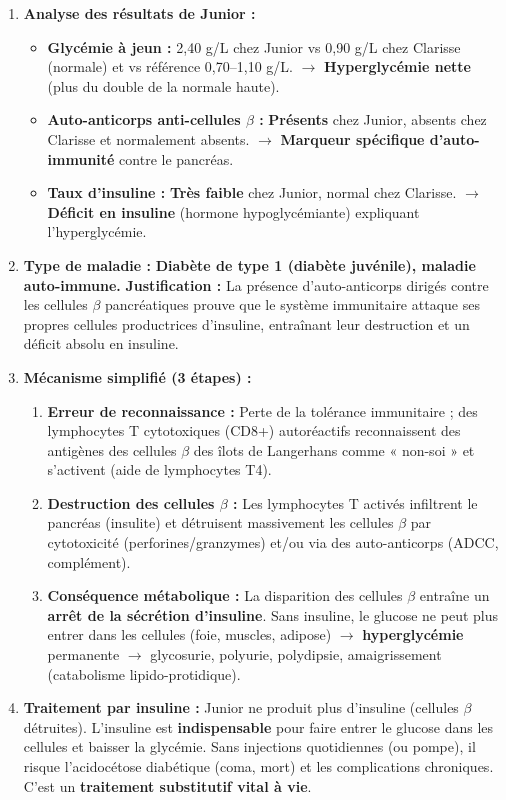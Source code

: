 \documentclass[11pt]{article}
\begin{document}
\begin{corrige}
\begin{enumerate}
\item \textbf{Analyse des résultats de Junior :}
\begin{itemize}
\item \textbf{Glycémie à jeun :} 2,40 g/L chez Junior vs 0,90 g/L chez Clarisse (normale) et vs référence 0,70--1,10 g/L. $\rightarrow$ \textbf{Hyperglycémie nette} (plus du double de la normale haute).
\item \textbf{Auto-anticorps anti-cellules $\beta$ :} \textbf{Présents} chez Junior, absents chez Clarisse et normalement absents. $\rightarrow$ \textbf{Marqueur spécifique d'auto-immunité} contre le pancréas.
\item \textbf{Taux d'insuline :} \textbf{Très faible} chez Junior, normal chez Clarisse. $\rightarrow$ \textbf{Déficit en insuline} (hormone hypoglycémiante) expliquant l'hyperglycémie.
\end{itemize}
\item \textbf{Type de maladie :} \textbf{Diabète de type 1 (diabète juvénile), maladie auto-immune.}
\textbf{Justification :} La présence d'auto-anticorps dirigés contre les cellules $\beta$ pancréatiques prouve que le système immunitaire attaque ses propres cellules productrices d'insuline, entraînant leur destruction et un déficit absolu en insuline.
\item \textbf{Mécanisme simplifié (3 étapes) :}
\begin{enumerate}
\item \textbf{Erreur de reconnaissance :} Perte de la tolérance immunitaire ; des lymphocytes T cytotoxiques (CD8+) autoréactifs reconnaissent des antigènes des cellules $\beta$ des îlots de Langerhans comme « non-soi » et s'activent (aide de lymphocytes T4).
\item \textbf{Destruction des cellules $\beta$ :} Les lymphocytes T activés infiltrent le pancréas (insulite) et détruisent massivement les cellules $\beta$ par cytotoxicité (perforines/granzymes) et/ou via des auto-anticorps (ADCC, complément).
\item \textbf{Conséquence métabolique :} La disparition des cellules $\beta$ entraîne un \textbf{arrêt de la sécrétion d'insuline}. Sans insuline, le glucose ne peut plus entrer dans les cellules (foie, muscles, adipose) $\rightarrow$ \textbf{hyperglycémie} permanente $\rightarrow$ glycosurie, polyurie, polydipsie, amaigrissement (catabolisme lipido-protidique).
\end{enumerate}
\item \textbf{Traitement par insuline :} Junior ne produit plus d'insuline (cellules $\beta$ détruites). L'insuline est \textbf{indispensable} pour faire entrer le glucose dans les cellules et baisser la glycémie. Sans injections quotidiennes (ou pompe), il risque l'acidocétose diabétique (coma, mort) et les complications chroniques. C'est un \textbf{traitement substitutif vital à vie}.

\end{enumerate}
\end{corrige}
\end{document}
